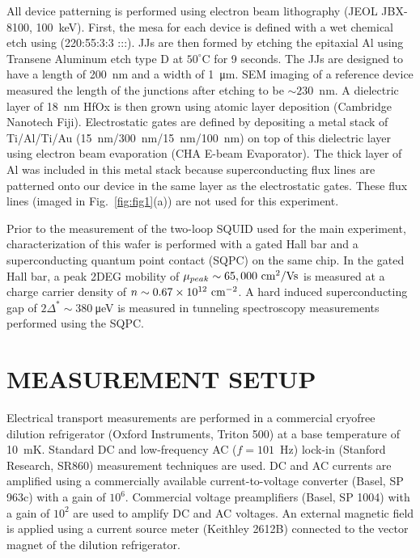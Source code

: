 \documentclass[%
 reprint,
 amsmath,amssymb,
 aps,
]{revtex4-2}
\begin{document}
All device patterning is performed using electron beam lithography (JEOL JBX-8100, 100~keV).  First, the mesa for each device is defined with a wet chemical etch using (220:55:3:3 :::). JJs are then formed by etching the epitaxial Al using Transene Aluminum etch type D at $50^{\circ}$C for 9 seconds. The JJs are designed to have a length of 200~nm and a width of 1~μm. SEM imaging of a reference device measured the length of the junctions after etching to be $\sim230$~nm. A dielectric layer of 18~nm HfOx is then grown using atomic layer deposition (Cambridge Nanotech Fiji). Electrostatic gates are defined by depositing a metal stack of Ti/Al/Ti/Au (15~nm/300~nm/15~nm/100~nm) on top of this dielectric layer using electron beam evaporation (CHA E-beam Evaporator). The thick layer of Al was included in this metal stack because superconducting flux lines are patterned onto our device in the same layer as the electrostatic gates. These flux lines (imaged in Fig.~\ref{fig:fig1}(a)) are not used for this experiment.

Prior to the measurement of the two-loop SQUID used for the main experiment, characterization of this wafer is performed with a gated Hall bar and a superconducting quantum point contact (SQPC) on the same chip. In the gated Hall bar, a peak 2DEG mobility of $\mu_{peak} \sim 65,000\textnormal{ cm}^2/\textnormal{Vs}$ is measured at a charge carrier density of $n \sim 0.67\times10^{12}\textnormal{ cm}^{-2}$. A hard induced superconducting gap of $2\Delta^* \sim 380~$μeV is measured in tunneling spectroscopy measurements performed using the SQPC.

\section{MEASUREMENT SETUP}
\label{app:appB}
Electrical transport measurements are performed in a commercial cryofree dilution refrigerator (Oxford Instruments, Triton 500) at a base temperature of 10~mK. Standard DC and low-frequency AC ($f=101$~Hz) lock-in (Stanford Research, SR860) measurement techniques are used. DC and AC currents are amplified using a commercially available current-to-voltage converter (Basel, SP 963c) with a gain of $10^6$. Commercial voltage preamplifiers (Basel, SP 1004) with a gain of $10^2$ are used to amplify DC and AC voltages. An external magnetic field is applied using a current source meter (Keithley 2612B) connected to the vector magnet of the dilution refrigerator.
\end{document}
